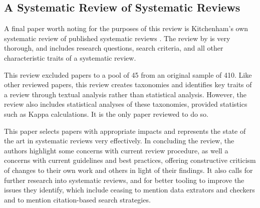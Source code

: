 \subsection{A Systematic Review of Systematic Reviews}
A final paper worth noting for the purposes of this review is Kitchenham's own systematic review of published systematic reviews \citep{Kitchenham2013}. The review by \citeauthor*{Kitchenham2013} is very thorough, and includes research questions, search criteria, and all other characteristic traits of a systematic review.\par

This review excluded papers to a pool of 45 from an original sample of 410. Like other reviewed papers, this review creates taxonomies and identifies key traits of a review through textual analysis rather than statistical analysis. However, the review also includes statistical analyses of these taxonomies, provided statistics such as Kappa calculations. It is the only paper reviewed to do so.\par

This paper selects papers with appropriate impacts and represents the state of the art in systematic reviews very effectively. In concluding the review, the authors highlight some concerns with current review procedure, as well a concerns with current guidelines and best practices, offering constructive criticism of changes to their own work and others in light of their findings. It also calls for further research into systematic reviews, and for better tooling to improve the issues they identify, which include ceasing to mention data extrators and checkers and to mention citation-based search strategies.\par
